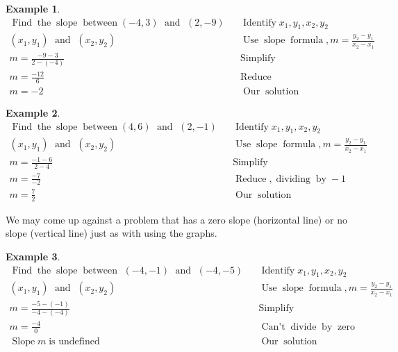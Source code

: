 \documentclass[12pt]{book}
\theoremstyle{definition}
\newtheorem{example}{Example}
\newcommand{\tmop}[1]{\ensuremath{\operatorname{#1}}}
\begin{document}
\begin{example}\label{Lin49}
  \begin{eqnarray*}
    \tmop{Find} \tmop{the} \tmop{slope} \tmop{between} (- 4, 3) \tmop{~and~} (2,
    - 9) &  & \tmop{Identify} x_1, y_1, x_2, y_2\\
    (x_1, y_1) \tmop{~and~} (x_2, y_2) &  & \tmop{Use} \tmop{slope}
    \tmop{formula}, m = \frac{y_2 - y_1}{x_2 - x_1}\\
    m = \frac{- 9 - 3}{2 - (- 4)} &  & \tmop{Simplify}\\
    m = \frac{-12}{6} &  & \tmop{Reduce}\\
    m = - 2 &  & \tmop{Our} \tmop{solution}
  \end{eqnarray*}
\end{example}
\begin{example}\label{Lin50}
  \begin{eqnarray*}
    \tmop{Find} \tmop{the} \tmop{slope} \tmop{between} (4, 6) \tmop{~and~} (2, -
    1) &  & \tmop{Identify} x_1, y_1, x_2, y_2\\
    (x_1, y_1) \tmop{~and~} (x_2, y_2) &  & \tmop{Use} \tmop{slope}
    \tmop{formula}, m = \frac{y_2 - y_1}{x_2 - x_1}\\
    m = \frac{- 1 - 6}{2 - 4} &  & \tmop{Simplify}\\
    m = \frac{- 7}{- 2} &  & \tmop{Reduce}, \tmop{dividing} \tmop{by} - 1\\
    m = \frac{7}{2} &  & \tmop{Our} \tmop{solution}
  \end{eqnarray*}
\end{example}
We may come up against a problem that has a zero slope (horizontal line) or no slope (vertical line) just as with using the graphs.
\begin{example}\label{Lin51}
  \begin{eqnarray*}
    \tmop{Find} \tmop{the} \tmop{slope} \tmop{between~} (- 4, - 1) \tmop{~and~}
    (- 4, - 5) &  & \tmop{Identify} x_1, y_1, x_2, y_2\\
    (x_1, y_1) \tmop{~and~} (x_2, y_2) &  & \tmop{Use} \tmop{slope}
    \tmop{formula}, m = \frac{y_2 - y_1}{x_2 - x_1}\\
    m = \frac{- 5 - (- 1)}{- 4 - (- 4)} &  & \tmop{Simplify}\\
    m = \frac{- 4}{0} &  & \tmop{Can' t} \tmop{divide} \tmop{by} \tmop{zero}\\
    \tmop{Slope} m \tmop{is~undefined} &  & \tmop{Our} \tmop{solution}
  \end{eqnarray*}
\end{example}
\end{document}
